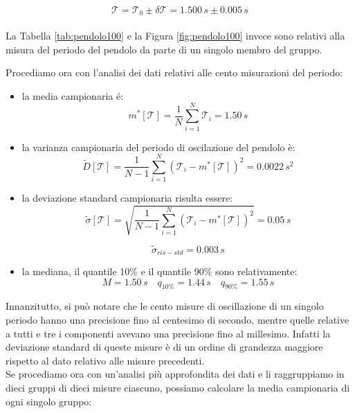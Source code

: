\begin{equation}
\mathcal{T} = \mathcal{T}_0 \pm \delta\mathcal{T} = 1.500\,s \pm 0.005\,s
\end{equation}\\

La Tabella \ref{tab:pendolo100} e la Figura \ref{fig:pendolo100} invece sono relativi alla misura del periodo del pendolo da parte di un singolo membro del gruppo.


Procediamo ora con l'analisi dei dati relativi alle cento misurazioni del periodo:

\begin{itemize}
    \item{la media campionaria é:}
        \begin{equation}
            m^*[\mathcal{T}] = \frac{1}{N} \sum_{i=1}^{N} \mathcal{T}_i = 1.50\,s
        \end{equation} 

    \item{la varianza campionaria del periodo di oscilazione del pendolo è:}
        \begin{equation}
            \tilde{D}[\mathcal{T}] = \frac{1}{N - 1} \sum_{i=1}^{N} (\mathcal{T}_i - m^*[\mathcal{T}])^2 = 0.0022\,s^2
        \end{equation}

    \item{la deviazione standard campionaria risulta essere:}
        \begin{equation}
            \tilde{\sigma}[\mathcal{T}] = \sqrt{\frac{1}{N - 1} \sum_{i=1}^{N} (\mathcal{T}_i - m^*[\mathcal{T}])^2} = 0.05\,s
        \end{equation}

        \begin{equation}
            \tilde{\sigma}_{ris-std} = 0.003\,s
        \end{equation}

    \item{la mediana, il quantile 10\% e il quantile 90\% sono relativamente:}
        \begin{equation*}
            M = 1.50\,s \quad
            q_{10\%} = 1.44\,s \quad
            q_{90\%} = 1.55\,s
        \end{equation*}
\end{itemize}

Innanzitutto, si può notare che le cento misure di oscillazione di un singolo periodo hanno una precisione fino al centesimo di secondo, mentre quelle relative a tutti e tre i componenti avevano una precisione fino al millesimo. Infatti la deviazione standard di queste misure è di un ordine di grandezza maggiore rispetto al dato relativo alle misure precedenti.\\
Se procediamo ora con un'analisi più approfondita dei dati e li raggruppiamo in dieci gruppi di dieci misure ciascuno, possiamo calcolare la media campionaria di ogni singolo gruppo:

